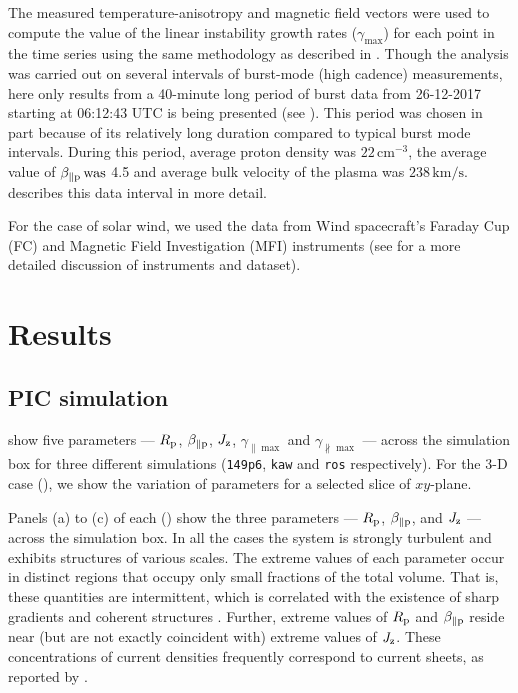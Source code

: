             The measured temperature-anisotropy and magnetic field vectors were used to compute the
            value of the linear instability growth rates ($\gamma_{\max}$) for each point in the
            time series using the same methodology as described in . Though the
            analysis was carried out on several intervals of burst-mode (high cadence) measurements,
            here only results from a 40-minute long period of burst data from 26-12-2017 starting at
            06:12:43 UTC is being presented (see ). This period was chosen in part
            because of its relatively long duration compared to typical burst mode intervals. During
            this period, average proton density was $22 \,\mathrm{cm}^{-3}$, the average value of
            $\beta_{\parallel \rm p}\, \mathrm{was}$ 4.5 and average bulk velocity of the plasma was
            $238\, \mathrm{km/s}$. \citet{Parashar2018a} describes this data interval in more
            detail.

            For the case of solar wind, we used the data from Wind spacecraft's Faraday Cup (FC) and
            Magnetic Field Investigation (MFI) instruments (see  for a more detailed
            discussion of instruments and dataset).

    \section{Results} \label{sec:res5}

        \subsection{PIC simulation} \label{sec:picr5}

             show five parameters --- $R_{\rm p}$,
            $\beta_{\parallel \rm p}$, $J_{\rm z}$, $\gamma_{\parallel \max}$ and
            $\gamma_{\nparallel \max}$ --- across the simulation box for three different simulations
            (\texttt{149p6}, \texttt{kaw} and \texttt{ros} respectively). For the 3-D case
            (), we show the variation of parameters for a selected slice of
            $xy$-plane.

            Panels (a) to (c) of each () show the three parameters
            --- $R_{\rm p}$, $\beta_{\parallel \rm p}$, and $J_{\rm z}$ --- across the simulation
            box. In all the cases the system is strongly turbulent and exhibits structures of
            various scales. The extreme values of each parameter occur in distinct regions that
            occupy only small fractions of the total volume. That is, these quantities are
            intermittent, which is correlated with the existence of sharp gradients and coherent
            structures \citep{Greco2014, Matthaeus2015, Greco2016, Perrone2016, Perrone2017}.
            Further, extreme values of $R_{\rm p}$ and $\beta_{\parallel \rm p}$ reside near (but
            are not exactly coincident with) extreme values of $J_{\rm z}$. These concentrations of
            current densities frequently correspond to current sheets, as reported by
            \citet{Parashar2016}.

